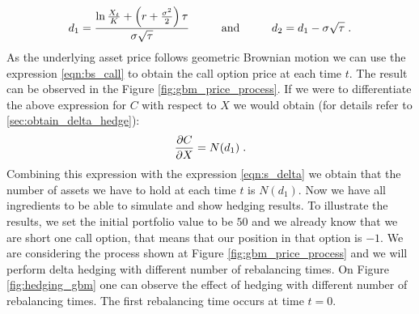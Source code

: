 \documentclass[times, utf8, diplomski]{fer}
\begin{document}
\begin{equation} \label{eqn:d1d2}
	d_1 = \frac{\ln{\frac{X_t}{K}} + \left(r + \frac{\sigma^2}{2} \right)\tau}{\sigma\sqrt{\tau}} \hspace{1cm} \mbox{and} \hspace{1cm} d_2 = d_1 - \sigma\sqrt{\tau} \hspace{0.1cm}.
\end{equation}
As the underlying asset price follows geometric Brownian motion we can use the expression \ref{eqn:bs_call} to obtain the call option price at each time $t$. The result can be observed in the Figure \ref{fig:gbm_price_process}. If we were to differentiate the above expression for $C$ with respect to $X$ we would obtain (for details refer to \ref{sec:obtain_delta_hedge}): 
\begin{equation} \label{eqn:delta_nd1}
	\frac{\partial C}{\partial X} = N(d_1) \hspace{0.1cm}.
\end{equation}
Combining this expression with the expression \ref{eqn:s_delta} we obtain that the number of assets we have to hold at each time $t$ is $N(d_1)$. Now we have all ingredients to be able to simulate and show hedging results. To illustrate the results, we set the initial portfolio value to be $50$ and we already know that we are short one call option, that means that our position in that option is $-1$. We are considering the process shown at Figure \ref{fig:gbm_price_process} and we will perform delta hedging with different number of rebalancing times. On Figure \ref{fig:hedging_gbm} one can observe the effect of hedging with different number of rebalancing times. The first rebalancing time occurs at time $t=0$. 
\end{document}
